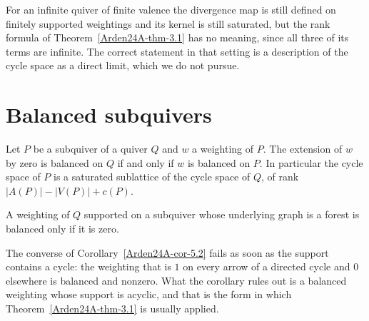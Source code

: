 \begin{remark}\label{Arden24A-rem-4.2}
\label{Arden24A-rem:infinite}
For an infinite quiver of finite valence the divergence map is still defined on finitely supported weightings and its kernel is still saturated, but the rank formula of Theorem~\ref{Arden24A-thm-3.1} has no meaning, since all three of its terms are infinite. The correct statement in that setting is a description of the cycle space as a direct limit, which we do not pursue.
\end{remark}

\section{Balanced subquivers}\label{Arden24A-sec-5}

\begin{theorem}\label{Arden24A-thm-5.1}
\label{Arden24A-thm:subquiver}
Let $P$ be a subquiver of a quiver $Q$ and $w$ a weighting of $P$. The extension of $w$ by zero is balanced on $Q$ if and only if $w$ is balanced on $P$. In particular the cycle space of $P$ is a saturated sublattice of the cycle space of $Q$, of rank $|A(P)| - |V(P)| + c(P)$.
\end{theorem}

\begin{corollary}\label{Arden24A-cor-5.2}
\label{Arden24A-cor:subquiver}
A weighting of $Q$ supported on a subquiver whose underlying graph is a forest is balanced only if it is zero.
\end{corollary}

\begin{remark}\label{Arden24A-rem-5.3}
\label{Arden24A-rem:local}
The converse of Corollary~\ref{Arden24A-cor-5.2} fails as soon as the support contains a cycle: the weighting that is $1$ on every arrow of a directed cycle and $0$ elsewhere is balanced and nonzero. What the corollary rules out is a balanced weighting whose support is acyclic, and that is the form in which Theorem~\ref{Arden24A-thm-3.1} is usually applied.
\end{remark}
